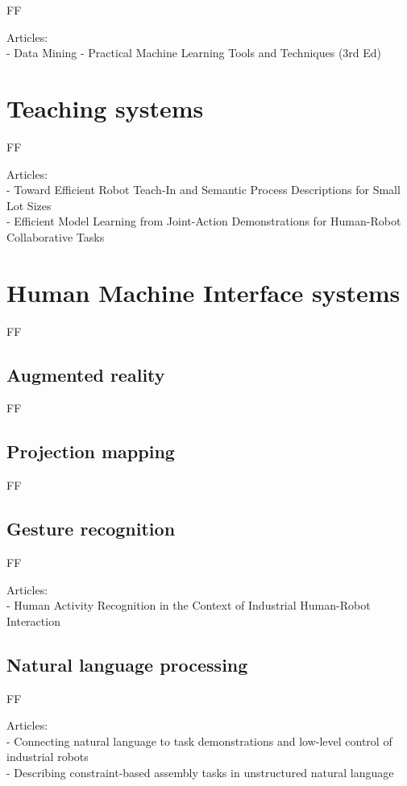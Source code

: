 FF

Articles:\\
- Data Mining - Practical Machine Learning Tools and Techniques (3rd Ed)


\section{Teaching systems}

FF

Articles:\\
- Toward Efficient Robot Teach-In and Semantic Process Descriptions for Small Lot Sizes\\
- Efficient Model Learning from Joint-Action Demonstrations for Human-Robot Collaborative Tasks


\section{Human Machine Interface systems}

FF


\subsection{Augmented reality}

FF


\subsection{Projection mapping}

FF


\subsection{Gesture recognition}

FF

Articles:\\
- Human Activity Recognition in the Context of Industrial Human-Robot Interaction


\subsection{Natural language processing}

FF

Articles:\\
- Connecting natural language to task demonstrations and low-level control of industrial robots\\
- Describing constraint-based assembly tasks in unstructured natural language


